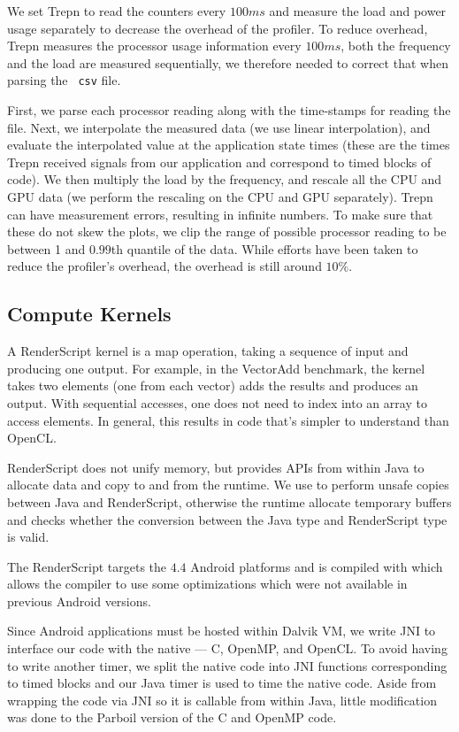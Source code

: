 We set Trepn to read
the counters every $100ms$ and measure the load and power usage separately to
decrease the overhead of the profiler.  To reduce overhead, Trepn measures the
processor usage information every $100ms$, both the frequency and the load are
measured sequentially, we therefore needed to correct that when parsing the {\tt
csv} file.

First, we parse each processor reading along with the time-stamps for reading the
file.  Next, we interpolate the measured data (we use linear interpolation), and
evaluate the interpolated value at the application state times (these are the times
Trepn received signals from our application and correspond to timed blocks of
code).  We then multiply the load by the frequency, and rescale all the CPU and
GPU data (we perform the rescaling on the CPU and GPU separately).  Trepn can
have measurement errors, resulting in infinite numbers.  To make sure that these
do not skew the plots, we clip the range of possible processor reading to be
between 1 and $0.99$th quantile of the data.  While efforts have
been taken to reduce the profiler's overhead, the overhead is still around
$10\%$.

\subsection{Compute Kernels}

A RenderScript kernel is a map operation, taking a sequence of input and producing one output. For example, in
the VectorAdd benchmark, the kernel takes two elements (one from each vector) adds the results and produces an output.
With sequential accesses, one does not need to index into an array to access elements. In general, this results in code that's simpler to understand than OpenCL. 

RenderScript does not unify memory, but provides APIs from within Java to allocate data and copy to and from the runtime. 
We use  to perform unsafe copies between Java and RenderScript, otherwise the runtime allocate temporary buffers and checks whether the conversion between the Java type and RenderScript type is valid.

The RenderScript targets the $4.4$ Android platforms and 
	is compiled with  which
	allows the compiler to use some optimizations which were not available in
	previous Android versions.

Since Android applications must be hosted within Dalvik VM, we write JNI to 
	interface our code with the native 
	--- C, OpenMP, and OpenCL. To avoid having to write another timer, 
	we split the native code into JNI functions corresponding to timed blocks and our
	Java timer is used to time the native code.
	Aside from
wrapping the code via JNI so it is callable from within Java, little
modification was done to the Parboil version of the C and OpenMP code.


